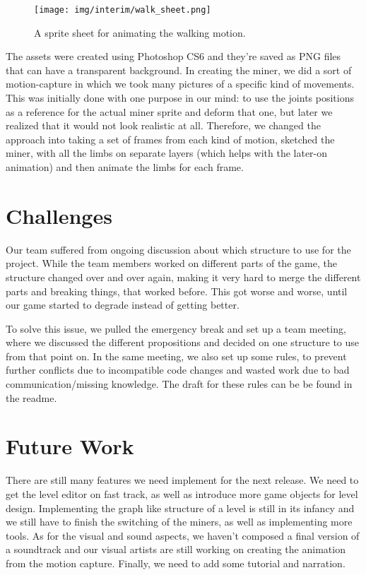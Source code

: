 \begin{figure}
\centering
\texttt{[image: img/interim/walk\_sheet.png]}
\caption{A sprite sheet for animating the walking motion.}
\end{figure}


The assets were created using Photoshop CS6 and they're saved as PNG files that can have a transparent background. 
In creating the miner, we did a sort of motion-capture in which we took many pictures of a specific kind of movements. This was initially done with one purpose in our mind: to use the joints positions as a reference for the actual miner sprite and deform that one, but later we realized that it would not look realistic at all. Therefore, we changed the approach into taking a set of frames from each kind of motion, sketched the miner, with all the limbs on separate layers (which helps with the later-on animation) and then animate the limbs for each frame. 

\section{Challenges}
Our team suffered from ongoing discussion about which structure to use for the project. While the team members worked on different parts of the game, the structure changed over and over again, making it very hard to merge the different parts and breaking things, that worked before. This got worse and worse, until our game started to degrade instead of getting better. 

To solve this issue, we pulled the emergency break and set up a team meeting, where we discussed the different propositions and decided on one structure to use from that point on. In the same meeting, we also set up some rules, to prevent further conflicts due to incompatible code changes and wasted work due to bad communication/missing knowledge. The draft for these rules can be be found in the readme.


\section{Future Work}There are still many features we need implement for the next release. We need to get the level editor on fast track, as well as introduce more game objects for level design. Implementing the graph like structure of a level is still in its infancy and we still have to finish the switching of the miners, as well as implementing more tools.
As for the visual and sound aspects, we haven’t composed a final version of a soundtrack and our visual artists are still working on creating the animation from the motion capture. Finally, we need to add some tutorial and narration.

